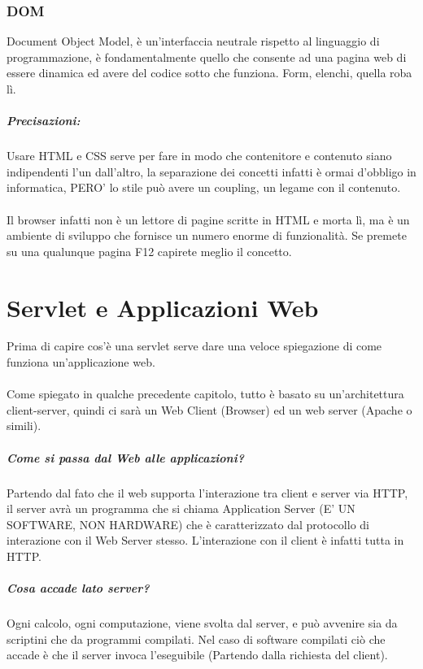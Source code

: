 \documentclass[12pt, a4paper, openany, twoside]{book}
\begin{document}
\subsection{DOM}
Document Object Model, è un'interfaccia neutrale rispetto al linguaggio di programmazione,
è fondamentalmente quello che consente ad una pagina web di essere dinamica ed 
avere del codice sotto che funziona. Form, elenchi, quella roba lì.
\paragraph{Precisazioni:} Usare HTML e CSS serve per fare in modo che contenitore
e contenuto siano indipendenti l'un dall'altro, la separazione dei concetti infatti
è ormai d'obbligo in informatica, PERO' lo stile può avere un coupling, un legame
con il contenuto. \\ \\
Il browser infatti non è un lettore di pagine scritte in HTML e morta lì, ma è un
ambiente di sviluppo che fornisce un numero enorme di funzionalità. Se premete
su una qualunque pagina F12 capirete meglio il concetto.
\chapter{Servlet e Applicazioni Web}
Prima di capire cos'è una servlet serve dare una veloce spiegazione di come funziona
un'applicazione web. \\ \\
Come spiegato in qualche precedente capitolo, tutto è basato su un'architettura 
client-server, quindi ci sarà un Web Client (Browser) ed un web server (Apache
o simili).
\paragraph{Come si passa dal Web alle applicazioni?} Partendo dal fato che il web
supporta l'interazione tra client e server via HTTP, il server avrà un programma 
che si chiama Application Server (E' UN SOFTWARE, NON HARDWARE) che è caratterizzato
dal protocollo di interazione con il Web Server stesso. L'interazione con il client
è infatti tutta in HTTP.
\paragraph{Cosa accade lato server?} Ogni calcolo, ogni computazione, viene 
svolta dal server, e può avvenire sia da scriptini che da programmi compilati.
Nel caso di software compilati ciò che accade è che il server invoca l'eseguibile
(Partendo dalla richiesta del client). 
\end{document}
